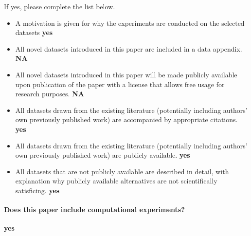 If yes, please complete the list below.
\begin{itemize}
\item A motivation is given for why the experiments are conducted on the selected datasets {\bf yes}
\item All novel datasets introduced in this paper are included in a data appendix. {\bf NA}
\item All novel datasets introduced in this paper will be made publicly available upon publication of the paper with a license that allows free usage for research purposes. {\bf NA}
\item All datasets drawn from the existing literature (potentially including authors’ own previously published work) are accompanied by appropriate citations. {\bf yes}
\item All datasets drawn from the existing literature (potentially including authors’ own previously published work) are publicly available. {\bf yes}
\item All datasets that are not publicly available are described in detail, with explanation why publicly available alternatives are not scientifically satisficing. {\bf yes}
\end{itemize}

\paragraph{Does this paper include computational experiments?} {\bf yes}

